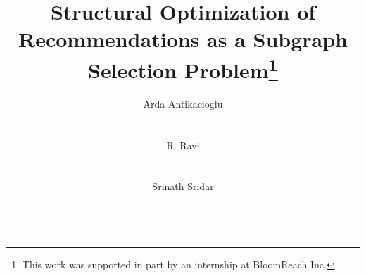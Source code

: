 \documentclass{sig-alternate}
\begin{document}
\title{Structural Optimization of Recommendations as a Subgraph Selection Problem\thanks{This work was supported in part by an internship at BloomReach Inc.}}

\author{
\alignauthor
Arda Antikacioglu \\
       \\
       \\
\alignauthor
R. Ravi \\
       \\
       \\
\alignauthor
Srinath Sridar \\
       \\
}

\maketitle

\setcounter{page}{1}










\pagebreak
\setcounter{page}{1}
{}

\end{document}
